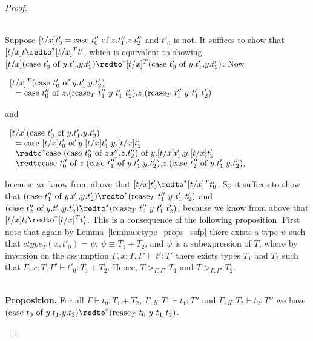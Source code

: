 \begin{proof}
\begin{itemize}
    \ \\
    Suppose $[t/x]t'_0 = \mbox{case}\ t''_0\ \text{of}\ z\text{.}t''_1\text{,}z\text{.}t''_2$ and $t'_0$ is not.  It suffices to show that 
    $[t/x]t \redto^* [t/x]^T t'$, which is equivalent to showing 
    $[t/x](\ccon{t'_0}{y}{t'_1}{t'_2}) \redto^* [t/x]^T (\ccon{t'_0}{y}{t'_1}{t'_2})$.  Now
    \begin{center}
      \begin{math}
        \begin{array}{lll}
          [t/x]^T (\mbox{case}\ t'_0\ \text{of}\ y\text{.}t'_1\text{,}y\text{.}t'_2)\\
          \,\,\,\,= \mbox{case}\ t''_0\ \text{of}\ z\text{.}(\mbox{rcase}_{T}\ t''_1\ y\ t'_1\ t'_2)\text{,}z\text{.}(\mbox{rcase}_{T}\ t''_1\ y\ t'_1\ t'_2)
        \end{array}
      \end{math}
    \end{center}
    and
    \begin{center}
      \begin{math}
        \begin{array}{lll}
          [t/x] (\ccon{t'_0}{y}{t'_1}{t'_2})\\
          \,\,\,\,= \ccon{[t/x]t'_0}{y}{[t/x]t'_1}{[t/x]t'_2} \\
          \,\,\,\,\redto^* \ccon{(\ccon{t''_0}{z}{t''_1}{t''_2})}{y}{[t/x]t'_1}{[t/x]t'_2} \\
          \,\,\,\,\redto \ccon{t''_0}{z}{(\ccon{t''_1}{y}{t'_1}{t'_2})}{(\ccon{t''_2}{y}{t'_1}{t'_2})},
        \end{array}
      \end{math}
    \end{center}
    because we know from above that $[t/x]t'_0 \redto^* [t/x]^T t'_0$.  So it suffices to show that
    $(\ccon{t''_1}{y}{t'_1}{t'_2}) \redto^* (\rcase{T}{t''_1}{y}{t'_1}{t'_2})$ and
    $(\ccon{t''_2}{y}{t'_1}{t'_2}) \redto^* (\rcase{T}{t''_2}{y}{t'_1}{t'_2})$, because we know from above that 
    $[t/x]t_i \redto^* [t/x]^T t'_i$.  This is a consequence of the following proposition.  First note that 
    again by Lemma~\ref{lemma:ctype_props_ssfp} there exists a type $\psi$ such that $ctype_T(x,t'_0) = \psi$,
    $\psi \equiv T_1+T_2$, and $\psi$ is a subexpression of $T$, where by inversion on the assumption
    $\Gamma,x:T,\Gamma' \vdash t':T'$ there exists types $T_1$ and $T_2$ such that 
    $\Gamma,x:T,\Gamma' \vdash t'_0:T_1+T_2$.  Hence, $T >_{\Gamma,\Gamma'} T_1$ and
    $T >_{\Gamma,\Gamma'} T_2$.  
    
    \ \\
    {\bf Proposition.} For all $\Gamma \vdash t_0:T_1+T_2$, $\Gamma,y:T_1 \vdash t_1:T''$ and
    $\Gamma,y:T_2 \vdash t_2:T''$ we have 
    $(\ccon{t_0}{y}{t_1}{t_2}) \redto^* (\rcase{T}{t_0}{y}{t_1}{t_2})$.
    

\end{itemize}
\end{proof}

